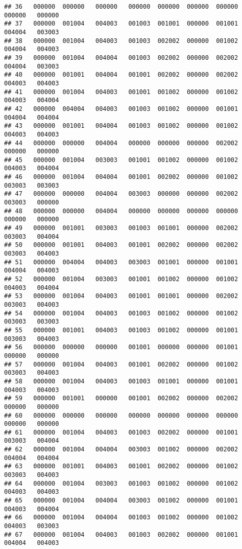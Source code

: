 \documentclass[
]{article}
\begin{document}
\begin{verbatim}
## 36   000000  000000   000000   000000  000000  000000  000000   000000   000000
## 37   000000  001004   004003   001003  001001  000000  001001   004004   003003
## 38   000000  001004   004003   001003  002002  000000  001002   004004   004003
## 39   000000  001004   004004   001003  002002  000000  002002   004004   003003
## 40   000000  001001   004004   001001  002002  000000  002002   004003   004003
## 41   000000  001004   004003   001001  001002  000000  001002   004003   004004
## 42   000000  004004   004003   001003  001002  000000  001001   004004   004004
## 43   000000  001001   004004   001003  001002  000000  001002   004003   004003
## 44   000000  000000   004004   000000  000000  000000  002002   000000   000000
## 45   000000  001004   003003   001001  001002  000000  001002   004003   004004
## 46   000000  001004   004004   001001  002002  000000  001002   003003   003003
## 47   000000  000000   004004   003003  000000  000000  002002   003003   000000
## 48   000000  000000   004004   000000  000000  000000  000000   000000   000000
## 49   000000  001001   003003   001003  001001  000000  002002   003003   004004
## 50   000000  001001   004003   001001  002002  000000  002002   003003   004003
## 51   000000  004004   004003   003003  001001  000000  001001   004004   004003
## 52   000000  001004   003003   001001  001002  000000  001002   004003   004004
## 53   000000  001004   004003   001001  001001  000000  002002   003003   004003
## 54   000000  001004   004003   001003  001002  000000  001002   003003   003003
## 55   000000  001001   004003   001003  001002  000000  001001   003003   004003
## 56   000000  000000   000000   001001  000000  000000  001001   000000   000000
## 57   000000  001004   004003   001001  002002  000000  001002   003003   004003
## 58   000000  001004   004003   001003  001001  000000  001001   004003   004003
## 59   000000  001001   000000   001001  002002  000000  002002   000000   000000
## 60   000000  000000   000000   000000  000000  000000  000000   000000   000000
## 61   000000  001004   004003   001003  002002  000000  001001   003003   004004
## 62   000000  001004   004004   003003  001002  000000  002002   004004   004004
## 63   000000  001001   004003   001001  002002  000000  001002   003003   004003
## 64   000000  001004   003003   001003  001002  000000  001002   004003   004003
## 65   000000  001004   004004   003003  001002  000000  001001   004003   004004
## 66   000000  001004   004004   001003  001002  000000  001002   004003   003003
## 67   000000  001004   004003   001003  002002  000000  001001   004004   004003

\end{verbatim}
\end{document}
